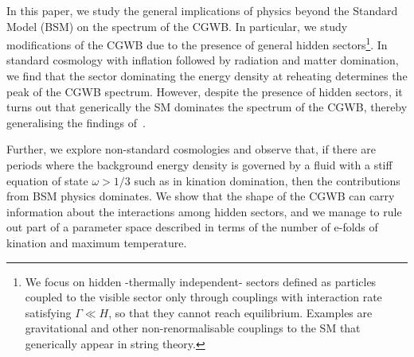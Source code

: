 \documentclass[a4paper,11pt]{article}
\begin{document}
In this paper, we study the general implications of physics beyond the Standard Model (BSM) on the spectrum of the CGWB. 
In particular, we study modifications of the CGWB due to the presence of general hidden sectors\footnote{
We focus on hidden -thermally independent- sectors 
defined as  particles coupled to the visible sector only through couplings with interaction rate satisfying $\Gamma \ll H$, so that they cannot reach equilibrium. Examples are gravitational and other non-renormalisable couplings to the SM  that generically appear in string theory.}.
In standard cosmology with inflation followed by radiation and matter domination,
we find that the sector dominating the energy density at reheating determines the peak of the CGWB spectrum.
However, despite the presence of hidden sectors,
it turns out that generically the SM dominates the spectrum of the CGWB, thereby generalising the findings of~\cite{Ringwald:2020ist}.  \vspace{0.1cm}


Further, we explore non-standard cosmologies and observe that, if there are periods where the background energy density is governed by a fluid with a stiff equation of state $\omega >1/3$ such as in kination domination,
then the contributions from BSM physics dominates. We show that the shape of the CGWB can carry information about the interactions among hidden sectors, and we manage to rule out part of a parameter space described in terms of the number of e-folds of kination and maximum temperature.  \vspace{0.1cm}
\end{document}
